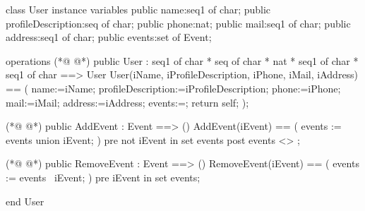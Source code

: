\begin{vdmpp}[breaklines=true]
class User
instance variables
  public name:seq1 of char;
  public profileDescription:seq of char;
  public phone:nat;
  public mail:seq1 of char;
  public address:seq1 of char;
  public events:set of Event;

operations
(*@
\label{User:11}
@*)
  public  User : seq1 of char * seq of char * nat * seq1 of char * seq1 of char  ==> User
  User(iName, iProfileDescription, iPhone, iMail, iAddress) == (
   name:=iName;
   profileDescription:=iProfileDescription;
   phone:=iPhone;
   mail:=iMail;
   address:=iAddress;
   events:={};
   return self;
  );

(*@
\label{AddEvent:22}
@*)
  public  AddEvent : Event  ==> ()
  AddEvent(iEvent) == (
    events := events union {iEvent};
 )
  pre
   not iEvent in set events
  post 
  events <> {};
    
(*@
\label{RemoveEvent:31}
@*)
  public  RemoveEvent : Event  ==> ()
  RemoveEvent(iEvent) == (
   events := events \ {iEvent};
  )
  pre
   iEvent in set events;


end User
\end{vdmpp}
